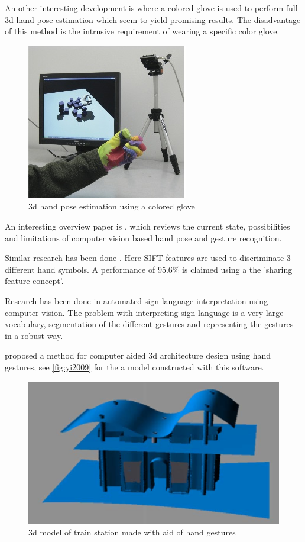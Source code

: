An other interesting development is \cite{Wang2009} where a colored glove is used to perform full 3d hand pose estimation which seem to yield promising results. The disadvantage of this method is the intrusive requirement of wearing a specific color glove. 

\begin{figure}[htbp]
	\center{}
	\label{fig:wang2009}
	\includegraphics[width=0.3\linewidth]{figures/wang2009.jpg}
	\caption{3d hand pose estimation using a colored glove}
\end{figure}

An interesting overview paper is \cite{Erol2007}, which reviews the current state, possibilities and limitations of computer vision based hand pose and gesture recognition.


Similar research has been done \cite{Wang2007}. Here SIFT features are used to discriminate 3 different hand symbols. A performance of 95.6\% is claimed using a the 'sharing feature concept'.


Research has been done in automated sign language interpretation using computer vision\cite{Buehler2009}\cite{RichardBowden2004}. The problem with interpreting sign language is a very large vocabulary, segmentation of the different gestures and representing the gestures in a robust way.

\cite{Yi2009} proposed a method for computer aided 3d architecture design using hand gestures, see \autoref{fig:yi2009} for the a model constructed with this software.

\begin{figure}[htbp]
	\center{}
	\includegraphics[width=0.3\linewidth]{figures/yi2009.png}
	\caption{3d model of train station made with aid of hand gestures}
	\label{fig:yi2009}
\end{figure}






